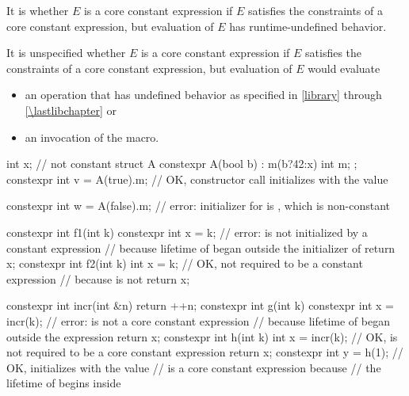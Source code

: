 \pnum
It is
whether $E$ is a core constant expression
if $E$ satisfies the constraints of a core constant expression, but
evaluation of $E$ has runtime-undefined behavior.

\pnum
It is unspecified whether $E$ is a core constant expression
if $E$ satisfies the constraints of a core constant expression, but
evaluation of $E$ would evaluate
\begin{itemize}
\item
an operation that has undefined behavior
as specified in \ref{library} through \ref{\lastlibchapter} or
\item
an invocation of the  macro.
\end{itemize}

\pnum
\begin{example}
\begin{codeblock}
int x;                              // not constant
struct A {
  constexpr A(bool b) : m(b?42:x) { }
  int m;
};
constexpr int v = A(true).m;        // OK, constructor call initializes  with the value 

constexpr int w = A(false).m;       // error: initializer for  is , which is non-constant

constexpr int f1(int k) {
  constexpr int x = k;              // error:  is not initialized by a constant expression
                                    // because lifetime of  began outside the initializer of 
  return x;
}
constexpr int f2(int k) {
  int x = k;                        // OK, not required to be a constant expression
                                    // because  is not 
  return x;
}

constexpr int incr(int &n) {
  return ++n;
}
constexpr int g(int k) {
  constexpr int x = incr(k);        // error:  is not a core constant expression
                                    // because lifetime of  began outside the expression 
  return x;
}
constexpr int h(int k) {
  int x = incr(k);                  // OK,  is not required to be a core constant expression
  return x;
}
constexpr int y = h(1);             // OK, initializes  with the value 
                                    //  is a core constant expression because
                                    // the lifetime of  begins inside 
\end{codeblock}
\end{example}

